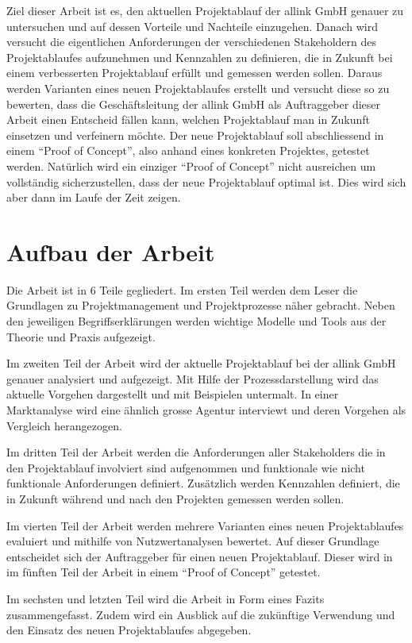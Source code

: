 Ziel dieser Arbeit ist es, den aktuellen Projektablauf der
allink GmbH genauer zu untersuchen und auf dessen Vorteile und Nachteile einzugehen.
Danach wird versucht die eigentlichen Anforderungen der verschiedenen Stakeholdern
des Projektablaufes aufzunehmen und Kennzahlen zu definieren, die in Zukunft
bei einem verbesserten Projektablauf erfüllt und gemessen werden sollen.
Daraus werden Varianten eines neuen Projektablaufes erstellt und versucht 
diese so zu bewerten, dass die Geschäftsleitung der allink GmbH als Auftraggeber 
dieser Arbeit einen
Entscheid fällen kann, welchen Projektablauf man in Zukunft einsetzen und 
verfeinern möchte. Der neue Projektablauf soll abschliessend in einem ``Proof of Concept'', also
anhand eines konkreten Projektes, getestet werden. Natürlich wird ein einziger
``Proof of Concept'' nicht ausreichen um vollständig sicherzustellen, dass der
neue Projektablauf optimal ist. Dies wird sich aber dann im Laufe der Zeit zeigen.

\section{Aufbau der Arbeit}
Die Arbeit ist in 6 Teile gegliedert. Im ersten Teil werden dem Leser die
Grundlagen zu Projektmanagement und Projektprozesse näher gebracht. Neben
den jeweiligen Begriffserklärungen werden wichtige Modelle und Tools aus der
Theorie und Praxis aufgezeigt.

Im zweiten Teil der Arbeit wird der aktuelle Projektablauf bei der allink
GmbH genauer analysiert und aufgezeigt. Mit Hilfe der Prozessdarstellung wird
das aktuelle Vorgehen dargestellt und mit Beispielen untermalt. In einer
Marktanalyse wird eine ähnlich grosse Agentur interviewt und deren Vorgehen
als Vergleich herangezogen.

Im dritten Teil der Arbeit werden die Anforderungen aller Stakeholders die in
den Projektablauf involviert sind aufgenommen und funktionale wie nicht funktionale
Anforderungen definiert. Zusätzlich werden Kennzahlen definiert, die in Zukunft
während und nach den Projekten gemessen werden sollen.

Im vierten Teil der Arbeit werden mehrere Varianten eines neuen Projektablaufes
evaluiert und mithilfe von Nutzwertanalysen bewertet. Auf dieser Grundlage
entscheidet sich der Auftraggeber für einen neuen Projektablauf. Dieser wird in 
im fünften Teil der Arbeit in einem ``Proof of Concept'' getestet.

Im sechsten und letzten Teil wird die Arbeit in Form eines Fazits zusammengefasst.
Zudem wird ein Ausblick auf die zukünftige Verwendung und den Einsatz des neuen
Projektablaufes abgegeben.

